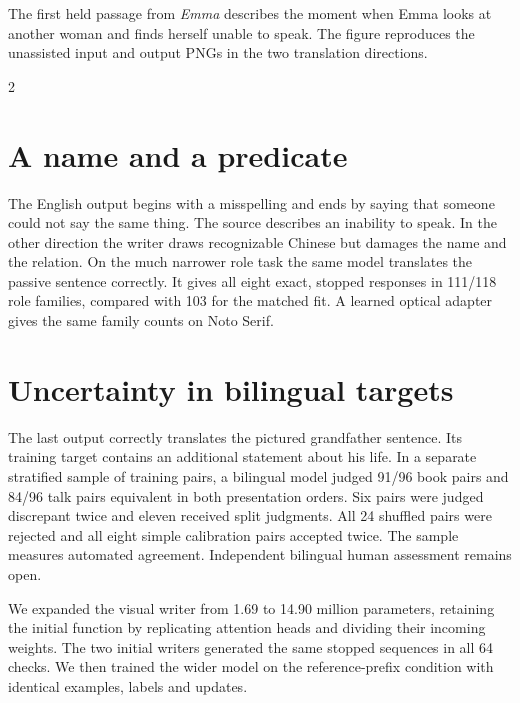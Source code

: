 \newpage
{}
\noindent The first held passage from \textit{Emma} describes the moment when Emma looks at another woman and finds herself unable to speak. The figure reproduces the unassisted input and output PNGs in the two translation directions.
\begin{multicols}{2}
\section*{A name and a predicate}
The English output begins with a misspelling and ends by saying that someone could not say the same thing. The source describes an inability to speak. In the other direction the writer draws recognizable Chinese but damages the name and the relation. On the much narrower role task the same model translates the passive sentence correctly. It gives all eight exact, stopped responses in 111/118 role families, compared with 103 for the matched fit. A learned optical adapter gives the same family counts on Noto Serif.
\section*{Uncertainty in bilingual targets}
The last output correctly translates the pictured grandfather sentence. Its training target contains an additional statement about his life. In a separate stratified sample of training pairs, a bilingual model judged 91/96 book pairs and 84/96 talk pairs equivalent in both presentation orders. Six pairs were judged discrepant twice and eleven received split judgments. All 24 shuffled pairs were rejected and all eight simple calibration pairs accepted twice. The sample measures automated agreement. Independent bilingual human assessment remains open.
\end{multicols}
\newpage
{}
\noindent We expanded the visual writer from 1.69 to 14.90 million parameters, retaining the initial function by replicating attention heads and dividing their incoming weights. The two initial writers generated the same stopped sequences in all 64 checks. We then trained the wider model on the reference-prefix condition with identical examples, labels and updates.
